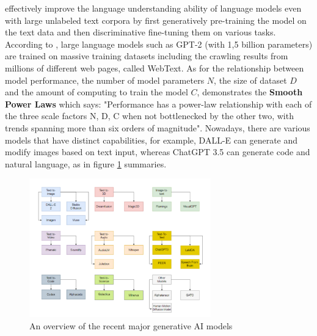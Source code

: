 \documentclass[runningheads]{llncs}
\begin{document}
effectively improve the language understanding ability of language models even with large unlabeled text corpora by first generatively pre-training the model on the text data and then discriminative fine-tuning them on various tasks.
According to \cite{Radford19}, large language models such as GPT-2 (with 1,5 billion parameters) are trained on massive training datasets including the crawling results from millions of different web pages, called WebText.
As for the relationship between model performance, the number of model parameters $N$, the size of dataset $D$ and the amount of computing to train the model $C$, \cite{Kaplan20} demonstrates the \textbf{Smooth Power Laws} which says:
"Performance has a power-law relationship with each of the three scale factors N, D, C when not bottlenecked by the other two, with trends spanning more than six orders of magnitude". Nowadays, there are various models
that have distinct capabilities, for example, DALL-E can generate and modify images based on text input, whereas ChatGPT 3.5 can generate code and natural language, as \cite{Gozalo23} in figure \ref{fig:model_overview} summaries.
\noindent \newline
\begin{figure}[]
  \centering
  \includegraphics[width=0.7\textwidth]{models overview.png}
  \caption{An overview of the recent major generative AI models  \cite{Gozalo23}}
  \label{fig:model_overview}
\end{figure}
\end{document}
